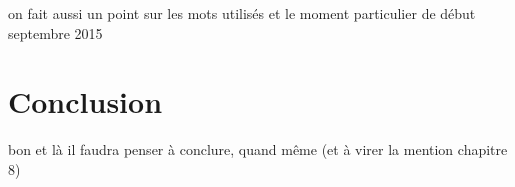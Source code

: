 \documentclass[symmetric,justified,marginals=raggedouter]{tufte-book}
\begin{document}
\noindent on fait aussi un point sur les mots utilisés et le moment particulier de début septembre 2015 


\chapter{Conclusion}

\noindent bon et là il faudra penser à conclure, quand même (et à virer la mention chapitre 8)









\backmatter





\printindex
\end{document}
